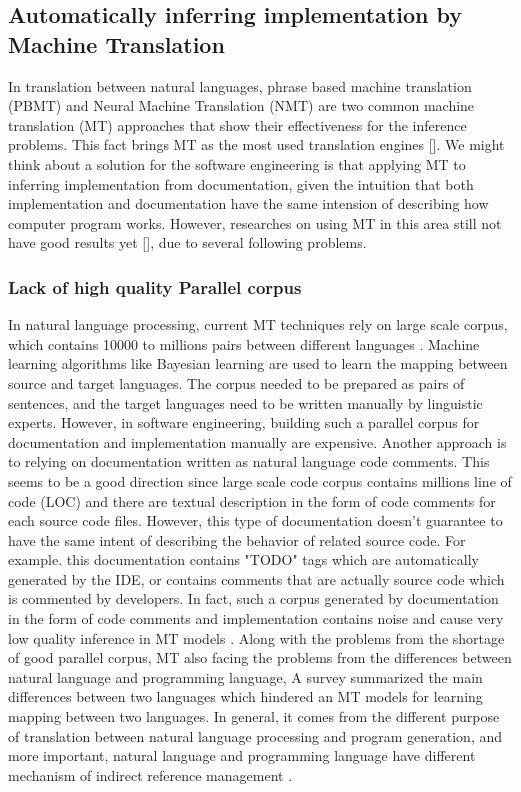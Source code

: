 \subsection{Automatically  inferring implementation by Machine Translation }
 In translation between natural languages, phrase based machine translation (PBMT) and Neural Machine Translation (NMT) are two common machine translation (MT) approaches that show their effectiveness for the inference problems. This fact brings MT as the most used translation engines [\cite{8416973}]. We might think about a solution for the software engineering is that applying MT to inferring implementation from documentation, given the intuition that both implementation and documentation have the same intension of describing how computer program works. However, researches on using MT in this area still not have good results yet [\cite{DBLP:journals/corr/BaroneS17}], due to several following problems.
\subsubsection{Lack of high quality Parallel corpus}
In natural language processing, current MT techniques rely on large scale corpus, which contains 10000 to millions pairs between different languages \cite{}. Machine learning algorithms like Bayesian learning are used to learn the mapping between source and target  languages. The corpus needed to be prepared as pairs of sentences, and the target languages need to be written manually by linguistic experts. However, in software engineering, building such a parallel corpus for documentation and implementation manually are expensive. 
Another approach is to relying on documentation written as natural language code comments. This seems to be a good direction since large scale code corpus contains millions line of code (LOC) and there are textual description in the form of code comments for each source code files. However, this type of documentation doesn't guarantee to have the same intent of describing the behavior of related source code. For example. this documentation contains "TODO" tags which are automatically generated by the IDE, or  contains comments that are actually source code which is commented by developers. In fact, such a corpus generated by documentation in the form of code comments and implementation contains noise and cause very low quality inference in MT models \cite{} .
Along with the problems from the shortage of good parallel corpus, MT also facing the problems from the differences between natural language and programming language, A survey \cite{} summarized the main differences between two languages which hindered an MT models for learning mapping between two languages. In general, it comes from the different purpose of translation between natural language processing and program generation, and more important, natural language and programming language have different mechanism of indirect reference management \cite{}.

